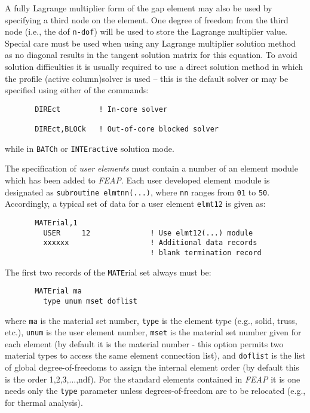 A fully Lagrange multiplier form of the gap element may also be used by
specifying a third node on the element.  One degree of freedom from
the third node (i.e., the dof \texttt{n-dof}) will be used to store the
Lagrange multiplier value.  Special care must be used when using any
Lagrange multiplier solution method as no diagonal results in the tangent
solution matrix for this equation.  To avoid solution difficulties it is
usually required to use a direct solution method in which the profile
(active column)solver is used -- this is the default solver or may be
specified using either of the commands:
\begin{verbatim}
       DIREct         ! In-core solver

       DIREct,BLOCk   ! Out-of-core blocked solver
\end{verbatim}
while in \texttt{BATCh} or \texttt{INTEractive} solution mode.

The specification of {\it user elements} must contain a number of an
element module which has been added to {\sl FEAP}.
Each user developed element module
is designated as \texttt{subroutine elmtnn(...)}, where \texttt{nn} ranges
from \texttt{01} to \texttt{50}.
Accordingly, a typical set of data for a user element \texttt{elmt12}
is given as:
\begin{verbatim}
       MATErial,1
         USER     12              ! Use elmt12(...) module
         xxxxxx                   ! Additional data records
                                  ! blank termination record
\end{verbatim}

The first two records of the \texttt{MATE}rial set always must be:

\begin{verbatim}
       MATErial ma
         type unum mset doflist
\end{verbatim}
where \texttt{ma} is the material set number, \texttt{type} is the element type
(e.g., solid, truss, etc.), \texttt{unum} is the user element number,
\texttt{mset} is the material set number given for each element (by default
it is the material number - this option permits two material types
to access the same element connection list), and \texttt{doflist} is the
list of global degree-of-freedoms to assign the internal element order (by
default this is the order 1,2,3,...,ndf).  For the standard elements contained
in {\sl FEAP} it is one needs only the \texttt{type} parameter unless
degrees-of-freedom are to be relocated (e.g., for thermal analysis).
